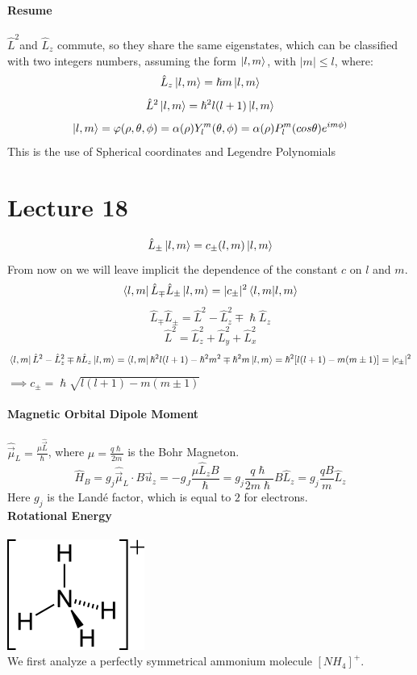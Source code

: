 \documentclass{article}
\begin{document}
\textbf{Resume} \\ \\ 
$\hat{L}^2 $and $\hat{L}_z$ commute, so they share the same eigenstates, which can be classified with two integers numbers, assuming the form $\ket{l,m}$, with $|m| \leq l$, where:
$$\hat{L}_z \ket{l,m} = \hslash m \ket{l,m}$$
$$\hat{L}^2 \ket{l,m} = \hslash^2 l (l+1) \ket{l,m}$$
$$\ket{l,m} = \varphi(\rho,\theta,\phi) = \alpha(\rho) Y_l^m(\theta,\phi) = \alpha(\rho) P_l^m (cos\theta) e^{i m\phi)}$$
This is the use of Spherical coordinates and Legendre Polynomials

\section{Lecture 18}
$$\hat{L}_{\pm} \ket{l,m} = c_{\pm}(l,m) \ket{l,m}$$
From now on we will leave implicit the dependence of the constant $c$ on $l$ and $m$.
$$\bra{l,m} \hat{L}_{\mp} \hat{L}_{\pm} \ket{l,m} = |c_{\pm}|^2 \bra{l,m}\ket{l,m}$$
$$\hat{L}_{\mp}\hat{L}_{\pm} = \hat{L}^2 - \hat{L}_z^2 \mp \hslash \hat{L}_z$$
$$\hat{L}^2 = \hat{L}_z^2 + \hat{L}_y^2 + \hat{L}_x^2$$
$$\bra{l,m}\hat{L}^2-\hat{L}_z^2 \mp \hslash \hat{L}_z \ket{l,m} = \bra{l,m}\hslash^2 l(l+1)- \hslash^2m^2 \mp \hslash^2 m \ket{l,m} = \hslash^2 [l(l+1)-m(m \pm1)] = |c_{\pm}|^2$$
$\implies c_{\pm} = \hslash \sqrt{l(l+1)-m(m\pm1)}$ \\ \\
\textbf{Magnetic Orbital Dipole Moment} \\ \\
$\hat{\Vec{\mu}}_L = \frac{\mu \hat{\Vec{L}}}{\hslash}$, where $\mu = \frac{q\hslash}{2m}$ is the Bohr Magneton.
$$\hat{H}_B = g_j\hat{\Vec{\mu}}_L \cdot B\Vec{u}_z = -g_J\frac{\mu\hat{L}_z B}{\hslash}= g_j \frac{q \hslash}{2m \hslash}B \hat{L}_z= g_j \frac{qB}{m} \hat{L}_z$$
Here $g_j$ is the Landé factor, which is equal to $2$ for electrons.
\\
\textbf{Rotational Energy} \\ \\
\includegraphics[scale = 0.5]{ammonium.png} \\ 
We first analyze a perfectly symmetrical ammonium molecule $[NH_4]^+$.
\end{document}
